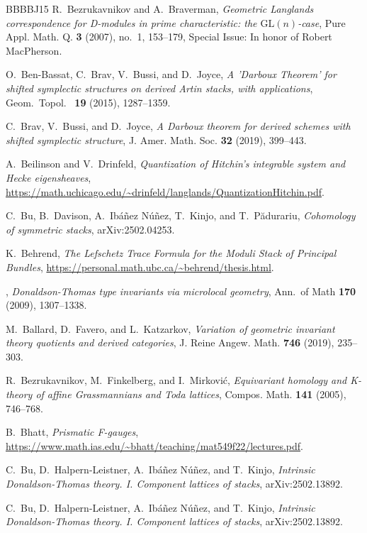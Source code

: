 \documentclass [11pt,oneside,a4paper,mathscr]{amsart}
\theoremstyle{definition}
\begin{document}
\begin{thebibliography}{BBBBJ15}
R.~Bezrukavnikov and A.~Braverman, \emph{Geometric {L}anglands correspondence for {D}-modules in prime characteristic: the $\text{GL}(n)$-case}, Pure Appl. Math. Q. \textbf{3} (2007), no.~1, 153--179, Special Issue: In honor of Robert MacPherson.

O.~Ben-Bassat, C.~Brav, V.~Bussi, and D.~Joyce, \emph{A '{D}arboux {T}heorem' for shifted symplectic structures on derived {A}rtin stacks, with applications}, Geom.~Topol.~ \textbf{19} (2015), 1287--1359.

C.~Brav, V.~Bussi, and D.~Joyce, \emph{A {D}arboux theorem for derived schemes with shifted symplectic structure}, J. Amer. Math. Soc. \textbf{32} (2019), 399--443.

A.~Beilinson and V.~Drinfeld, \emph{Quantization of {H}itchin's integrable system and {H}ecke eigensheaves}, \url{https://math.uchicago.edu/~drinfeld/langlands/QuantizationHitchin.pdf}.

C.~Bu, B.~Davison, A.~{I}báñez {N}úñez, T.~Kinjo, and T.~Pădurariu, \emph{Cohomology of symmetric stacks}, arXiv:2502.04253.

K.~Behrend, \emph{The {L}efschetz {T}race {F}ormula for the {M}oduli {S}tack of {P}rincipal {B}undles}, \url{https://personal.math.ubc.ca/~behrend/thesis.html}.

\bysame, \emph{Donaldson-{T}homas type invariants via microlocal geometry}, Ann.~of Math \textbf{170} (2009), 1307--1338.

M.~Ballard, D.~Favero, and L.~Katzarkov, \emph{Variation of geometric invariant theory quotients and derived categories}, J. Reine Angew. Math. \textbf{746} (2019), 235--303.

R.~Bezrukavnikov, M.~Finkelberg, and I.~Mirković, \emph{Equivariant homology and {K}-theory of affine {G}rassmannians and {T}oda lattices}, Compos. Math. \textbf{141} (2005), 746--768.

B.~Bhatt, \emph{Prismatic {F}-gauges}, \url{https://www.math.ias.edu/~bhatt/teaching/mat549f22/lectures.pdf}.

C.~Bu, D.~Halpern-Leistner, A.~{I}báñez {N}úñez, and T.~Kinjo, \emph{Intrinsic {D}onaldson-{T}homas theory. {I}. {C}omponent lattices of stacks}, arXiv:2502.13892.

C.~Bu, D.~Halpern-Leistner, A.~Ib{\'a}{\~n}ez N{\'u}{\~n}ez, and T.~Kinjo, \emph{Intrinsic {D}onaldson-{T}homas theory. {I}. {C}omponent lattices of stacks}, arXiv:2502.13892.


\end{thebibliography}
\end{document}

